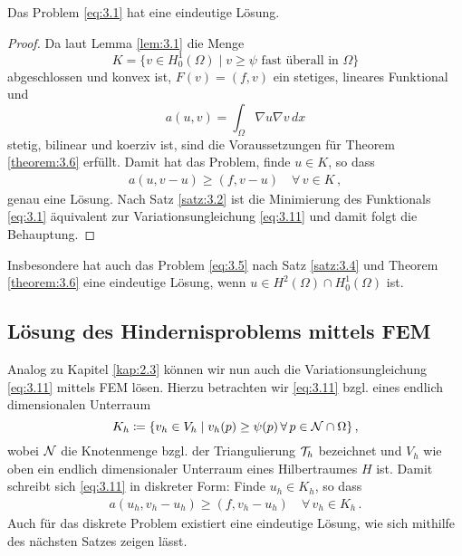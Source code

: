 \newpage

\begin{kor}\label{kor:3.7}
Das Problem \eqref{eq:3.1} hat eine eindeutige Lösung.
\end{kor}

\begin{proof}
Da laut Lemma \ref{lem:3.1} die Menge 
\[
	K=\{v \in H^1_0(\Omega) \mid v \ge \psi \text{ fast überall in }\Omega\}
\]
abgeschlossen und konvex ist, $F(v) = (f,v)$ ein stetiges, lineares Funktional und 
\[
	a(u,v) = \int_\Omega \nabla u \nabla v \, dx
\]
stetig, bilinear und koerziv ist, sind die Voraussetzungen für Theorem \ref{theorem:3.6} erfüllt. Damit hat das Problem, finde $u \in K$, so dass
\begin{align}\label{eq:3.11}
	a(u,v-u) \ge (f,v-u) \quad \forall \, v \in K \, ,
\end{align}
genau eine Lösung. Nach Satz \ref{satz:3.2} ist die Minimierung des Funktionals \eqref{eq:3.1} äquivalent zur Variationsungleichung \eqref{eq:3.11} und damit folgt die Behauptung.
\end{proof}


\begin{bem}\label{bem:3.8}
Insbesondere hat auch das Problem \eqref{eq:3.5} nach Satz \ref{satz:3.4} und Theorem \ref{theorem:3.6} eine eindeutige Lösung, wenn $u \in H^2(\Omega) \cap H^1_0(\Omega)$ ist.
\end{bem}







\subsection{Lösung des Hindernisproblems mittels FEM}
\label{kap:3.1.3}

Analog zu Kapitel \ref{kap:2.3} können wir nun auch die Variationsungleichung \eqref{eq:3.11} mittels FEM lösen. Hierzu betrachten wir \eqref{eq:3.11} bzgl. eines endlich dimensionalen Unterraum
\[
	K_h \coloneqq \{v_h \in V_h \mid v_h (p) \ge \psi(p) \, \forall \, p \in \mathcal N \cap \Omega\}\, ,
\]
wobei $\mathcal N$ die Knotenmenge bzgl. der Triangulierung $\mathcal T_h$ bezeichnet und $V_h$ wie oben ein endlich dimensionaler Unterraum eines Hilbertraumes $H$ ist. Damit schreibt sich \eqref{eq:3.11} in diskreter Form: Finde $u_h \in K_h$, so dass
\begin{align}\label{eq:3.12}
	a(u_h,v_h-u_h) \ge (f,v_h-u_h) \quad \forall \, v_h \in K_h \, .
\end{align}
Auch für das diskrete Problem existiert eine eindeutige Lösung, wie sich mithilfe des nächsten Satzes zeigen lässt.

